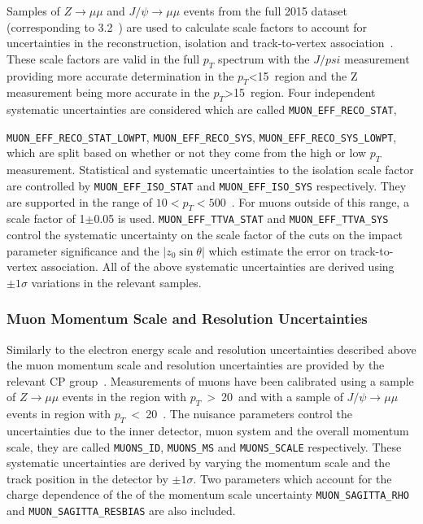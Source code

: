 Samples of $Z \to \mu\mu$ and $J/\psi \to \mu\mu$ events from the full 2015
dataset (corresponding to 3.2~\invfb) are used to calculate scale factors to
account for uncertainties in the reconstruction, isolation and track-to-vertex
association~\cite{muonTWiki}. These scale factors are valid in the full $p_T$
spectrum with the $J/psi$ measurement providing more accurate determination in
the $p_T$<15~\GeV region and the Z measurement being more accurate in the
$p_T$>15~\GeV region. Four independent systematic uncertainties are considered
which are called \texttt{MUON\_EFF\_RECO\_STAT},

\texttt{MUON\_EFF\_RECO\_STAT\_LOWPT}, \texttt{MUON\_EFF\_RECO\_SYS},
\texttt{MUON\_EFF\_RECO\_SYS\_LOWPT}, which are split based on whether or not
they come from the high or low $p_T$ measurement. Statistical and systematic
uncertainties to the isolation scale factor are controlled by
\texttt{MUON\_EFF\_ISO\_STAT} and \texttt{MUON\_EFF\_ISO\_SYS} respectively.
They are supported in the range of $10 < p_T < 500$~\GeV. For muons outside of
this range, a scale factor of 1$\pm$0.05 is used.
\texttt{MUON\_EFF\_TTVA\_STAT} and \texttt{MUON\_EFF\_TTVA\_SYS} control the
systematic uncertainty on the scale factor of the cuts on the impact parameter
significance and the $|z_0\sin\theta|$ which estimate the error on
track-to-vertex association. All of the above systematic uncertainties are
derived using $\pm 1\sigma$ variations in the relevant samples.

\subsubsection{Muon Momentum Scale and Resolution Uncertainties}

Similarly to the electron energy scale and resolution uncertainties described
above the muon momentum scale and resolution uncertainties are provided by the
relevant CP group~\cite{muonTWiki}. Measurements of muons have been calibrated
using a sample of  $Z\rightarrow \mu\mu$ events in the region with
$p_T$~>~20~\GeV and with a sample of $J/\psi\rightarrow \mu\mu$ events in region
with $p_T$~<~20~\GeV. The nuisance parameters control the uncertainties due to
the inner detector, muon system and the overall momentum scale, they are called
\texttt{MUONS\_ID}, \texttt{MUONS\_MS} and \texttt{MUONS\_SCALE} respectively.
These systematic uncertainties are derived by varying the momentum scale and the
track position in the detector by $\pm 1\sigma$. Two parameters which account
for the charge dependence of the of the momentum scale uncertainty
\texttt{MUON\_SAGITTA\_RHO} and \texttt{MUON\_SAGITTA\_RESBIAS} are also included.

